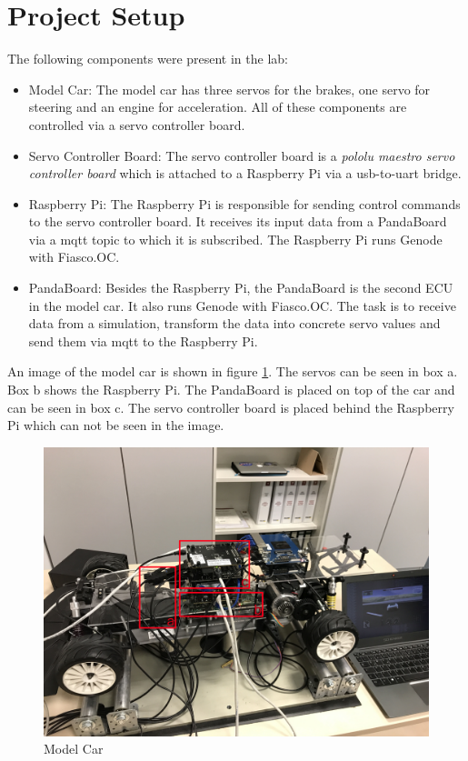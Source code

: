 \section{Project Setup}
The following components were present in the lab:

\begin{itemize}
    \item Model Car: The model car has three servos for the brakes, one servo for steering and an engine for acceleration. All of these components are controlled via a servo controller board.
   
    \item Servo Controller Board: The servo controller board is a \textit{pololu maestro servo controller board} which is attached to a Raspberry Pi via a usb-to-uart bridge.
   
    \item Raspberry Pi: The Raspberry Pi is responsible for sending control commands to the servo controller board. It receives its input data from a PandaBoard via a mqtt topic to which it is subscribed. The Raspberry Pi runs Genode with Fiasco.OC.
   
    \item PandaBoard: Besides the Raspberry Pi, the PandaBoard is the second ECU in the model car. It also runs Genode with Fiasco.OC. The task is to receive data from a simulation, transform the data into concrete servo values and send them via mqtt to the Raspberry Pi.
\end{itemize}

An image of the model car is shown in figure \ref{fig:model}. The servos can be seen in box a. Box b shows the Raspberry Pi. The PandaBoard is placed on top of the car and can be seen in box c. The servo controller board is placed behind the Raspberry Pi which can not be seen in the image. \\

\begin{figure}[h]
       \centering
       \includegraphics[trim={0 5cm 0 30cm},clip,width=1.0\linewidth]{images/model}
       \caption{Model Car}
       \label{fig:model}
\end{figure}

